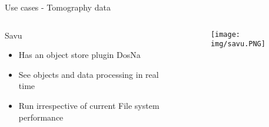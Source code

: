 \begin{frame}{Use cases - Tomography data}
    \begin{columns}
    \begin{column}{0.47\textwidth}
    \begin{block}{Savu}
        \begin{itemize}
            \item Has an object store plugin DosNa
            \item See objects and data processing in real time
            \item Run irrespective of current File system performance 
        \end{itemize}
    \end{block}
    \end{column}
    \begin{column}{0.47\textwidth}
    \begin{figure}
        \centering
        \texttt{[image: img/savu.PNG]}
        \label{fig:my_label}
    \end{figure}
    \end{column}
\end{columns}
\end{frame}